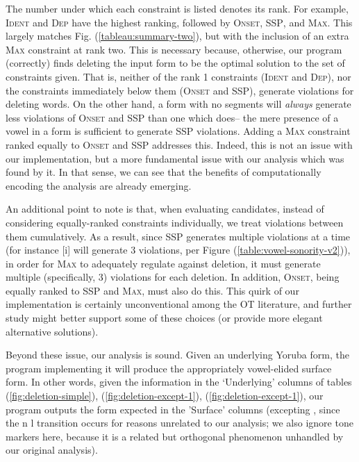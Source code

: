 \documentclass[12pt]{article}
\newcommand{\ident}{\textsc{Ident}}
\newcommand{\maxc}{\textsc{Max}}
\newcommand{\ssp}{\textsc{SSP}}
\newcommand{\dep}{\textsc{Dep}}
\newcommand{\onset}{\textsc{Onset}}
\newcommand{\pref}[1]{(\ref{#1})}
\begin{document}
The number under which each constraint is listed denotes its rank.
For example, \ident{} and \dep{} have the highest ranking, followed
by \onset{}, \ssp{}, and \maxc{}. This largely matches
Fig. \pref{tableau:summary-two}, but with the inclusion of an extra
\maxc{} constraint at rank two. This is necessary because,
otherwise, our program (correctly) finds deleting the input form
to be the optimal solution to the set of constraints given. That is,
neither of the rank 1 constraints (\ident{} and \dep{}), nor the
constraints immediately below them (\onset{} and \ssp{}), generate
violations for deleting words. On the other hand, a form with no
segments will \textit{always} generate less violations of \onset{}
and \ssp{} than one which does-- the mere presence of a vowel in a
form is sufficient to generate \ssp{} violations. Adding a \maxc{}
constraint ranked equally to \onset{} and \ssp{} addresses this.
Indeed, this is not an issue with our implementation, but a more
fundamental issue with our analysis which was found by it. In that
sense, we can see that the benefits of computationally encoding the
analysis are already emerging.

An additional point to note is that, when evaluating candidates,
instead of considering equally-ranked constraints individually, we
treat violations between them cumulatively. As a result, since
\ssp{} generates multiple violations at a time (for instance [i]
will generate 3 violations, per Figure
\pref{table:vowel-sonority-v2}), in order for \maxc{} to
adequately regulate against deletion, it must generate multiple
(specifically, 3) violations for each deletion. In addition,
\onset{}, being equally ranked to \ssp{} and \maxc{}, must also
do this. This quirk of our implementation is certainly
unconventional among the OT literature, and further study might
better support some of these choices (or provide more elegant
alternative solutions).

Beyond these issue, our analysis is sound. Given an underlying
Yoruba form, the program implementing it will produce the
appropriately vowel-elided surface form. In other words, given
the information in the `Underlying' columns of tables
\pref{fig:deletion-simple}, \pref{fig:deletion-except-1},
\pref{fig:deletion-except-1}, our program outputs the
form expected in the 'Surface' columns (excepting
 \rightarrow{} \textipa{[l\'oko]},
since the n \rightarrow{} l transition occurs for reasons
unrelated to our analysis; we also ignore tone markers
here, because it is a related but orthogonal phenomenon
unhandled by our original analysis).
\end{document}
